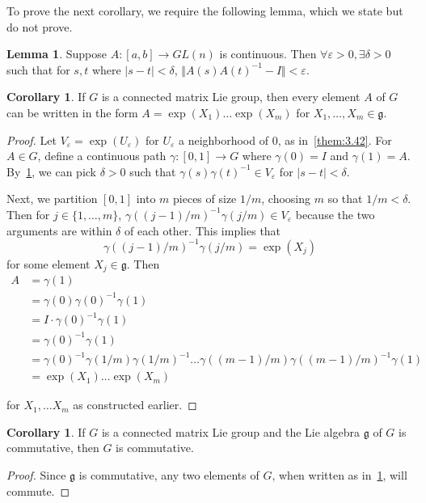 \documentclass[12pt]{article}
\newcommand{\g}{\mathfrak{g}}
\newcommand{\V}{\Vert}
\theoremstyle{definition}
\theoremstyle{definition}
\newtheorem{cor}[them]{Corollary}
\theoremstyle{definition}
\newtheorem{lem}[them]{Lemma}
\theoremstyle{definition}
\theoremstyle{definition}
\theoremstyle{definition}
\theoremstyle{definition}
\theoremstyle{definition}
\begin{document}
To prove the next corollary, we require the
following lemma, which we state but do not prove.

\begin{lem}\label{lem:3.46}
    Suppose $A: [a, b] \to GL(n)$ is continuous.
    Then $\forall \varepsilon > 0, \exists \delta >
    0$ such that for $s, t$ where $|s-t| <
    \delta$, $\V A(s) {A(t)}^{-1}-I \V < \varepsilon$.
\end{lem}

\begin{cor}\label{cor:3.47}
    If $G$ is a connected matrix Lie group, then
    every element $A$ of $G$ can be written in the
    form $A = \exp(X_1)\hdots\exp(X_m)$
    for $X_1, \hdots, X_m \in \g$.
\end{cor}
\begin{proof}
\par{Let $V_\varepsilon = \exp(U_\varepsilon)$ for
$U_\varepsilon$ a neighborhood of $0$, as
in~\ref{them:3.42}. For $A \in G$, define a
continuous path $\gamma: [0,1] \to G$ where
$\gamma(0) = I$ and $\gamma(1) = A$.
By~\ref{lem:3.46}, we can pick $\delta > 0$
such that ${\gamma(s)\gamma(t)}^{-1} \in
V_\varepsilon$ for $|s - t| < \delta$.}

\par{Next, we partition $[0,1]$ into $m$ pieces of
size $1/m$, choosing $m$ so that $1/m < \delta$.
Then for $j \in \{1, \hdots, m\}$,
${\gamma((j-1)/m)}^{-1}\gamma(j/m) \in
V_\varepsilon$ because the two arguments are
within $\delta$ of each other. This implies that
\[
{\gamma((j-1)/m)}^{-1}\gamma(j/m) = \exp(X_j)
\] for some element $X_j \in \g$. Then
\[
\begin{aligned}
A & = \gamma(1) \\
& = \gamma(0) {\gamma(0)}^{-1} \gamma(1) \\
& = I \cdot {\gamma(0)}^{-1} \gamma(1) \\
& = {\gamma(0)}^{-1} \gamma(1) \\
& = {\gamma(0)}^{-1} \gamma(1/m) 
{\gamma(1/m)}^{-1} \hdots \gamma((m-1)/m)
{\gamma((m-1)/m)}^{-1} \gamma(1) \\
& = \exp(X_1) \hdots \exp(X_m) 
\end{aligned}\]

for $X_1, \hdots
X_m$ as constructed earlier.}   
\end{proof}

\begin{cor}
    If $G$ is a connected matrix Lie group and the
    Lie algebra $\g$ of $G$ is commutative, then
    $G$ is commutative.
\end{cor}
\begin{proof}
    Since $\g$ is commutative, any two elements of
    $G$, when written as in~\ref{cor:3.47}, will commute.
\end{proof}
\end{document}
